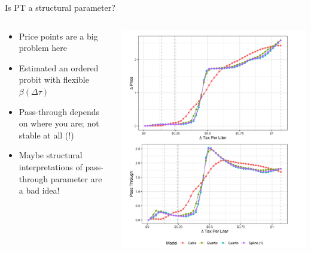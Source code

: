 \begin{frame}{Is PT a structural parameter?}
\begin{columns}
\begin{column}{0.5\textwidth}
\begin{itemize}
\item Price points are a big problem here
\item Estimated an ordered probit with flexible $\beta(\Delta \tau)$
\item Pass-through depends on where you are; not stable at all (!)
\item Maybe structural interpretations of pass-through parameter are a bad idea!
\end{itemize}
\end{column}
\begin{column}{0.5\textwidth}
\includegraphics[height=0.9\textheight]{resources/cr_3.png}
\end{column}
\end{columns}
\end{frame}

